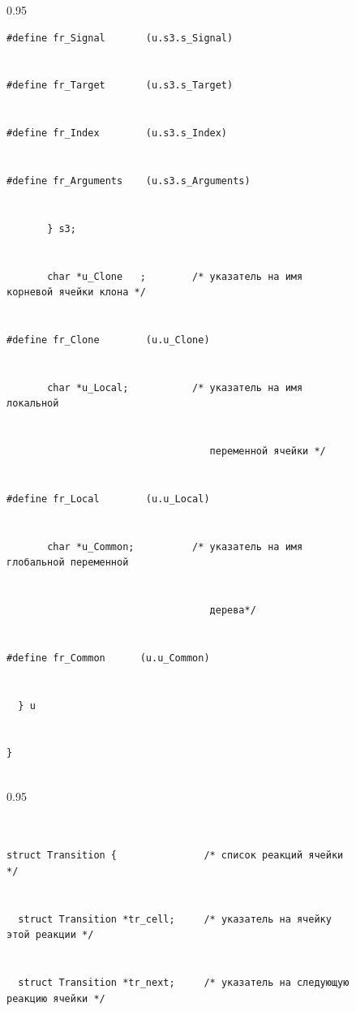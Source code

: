 \begin{figure}
\begin{center}
\begin{fmpage}{0.95\textwidth}
\begin{verbatim}
#define fr_Signal       (u.s3.s_Signal) 


#define fr_Target       (u.s3.s_Target) 


#define fr_Index        (u.s3.s_Index) 


#define fr_Arguments    (u.s3.s_Arguments) 


       } s3; 


       char *u_Clone   ;        /* указатель на имя корневой ячейки клона */ 


#define fr_Clone        (u.u_Clone) 


       char *u_Local;           /* указатель на имя локальной


                                   переменной ячейки */ 


#define fr_Local        (u.u_Local) 


       char *u_Common;          /* указатель на имя глобальной переменной


                                   дерева*/ 


#define fr_Common      (u.u_Common) 


  } u 


}


\end{verbatim}


\end{fmpage}


\end{center}


\vspace*{-6pt}








\vspace*{12pt}


\begin{center}


\begin{fmpage}{0.95\textwidth}


\begin{verbatim}


struct Transition {               /* список реакций ячейки */ 


  struct Transition *tr_cell;     /* указатель на ячейку этой реакции */ 


  struct Transition *tr_next;     /* указатель на следующую реакцию ячейки */ 



\end{verbatim}
\end{fmpage}
\end{center}
\end{figure}

